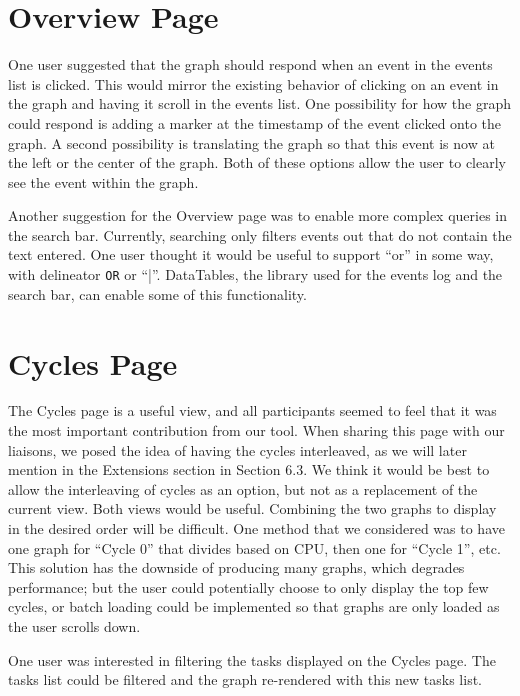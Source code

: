 \documentclass{hmcclinic}
\begin{document}
\section{Overview Page}
One user suggested that the graph should respond when an event in the events list is clicked.
 This would mirror the existing behavior of clicking on an event in the graph and having
  it scroll in the events list. One possibility for how the graph could respond is adding
   a marker at the timestamp of the event clicked onto the graph. A second possibility is
    translating the graph so that this event is now at the left or the center of the graph. Both of these options allow the user to clearly see the event within the graph.

  Another suggestion for the Overview page was to enable more complex queries in the 
  search bar. Currently, searching only filters events out that do not 
  contain the text entered. One user thought it would be useful to support
  ``or'' in 
  some way, with delineator \texttt{OR} or ``|''. DataTables, the library used for the 
  events log and the search bar, can enable some of this functionality.

  \section{Cycles Page}

  The Cycles page is a useful view, and all participants seemed to feel that 
  it was the most important contribution from our tool. When sharing this page with our liaisons, 
  we posed the idea of having the cycles interleaved, as we will later mention in the Extensions section in Section 6.3. We think it would be best to allow the interleaving of cycles as 
  an option, but not as a replacement of the current view. Both views would be 
  useful. Combining the two graphs to display in the desired order will be 
  difficult. One method that we considered was to have one graph for ``Cycle 0''
  that divides based on CPU, then one for ``Cycle 1'', etc. This solution has the
  downside of producing many graphs, which degrades performance; but the user could potentially choose to
  only display the top few cycles, or batch loading could be implemented so that
  graphs are only loaded as the user scrolls down.

  One user was interested in filtering the tasks displayed on the Cycles page.
  The tasks list could be filtered and the graph re-rendered with this new tasks
  list.
\end{document}
